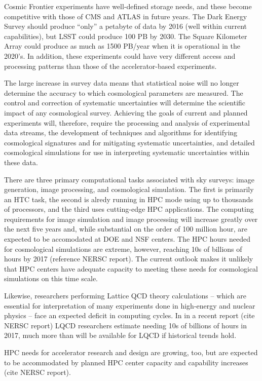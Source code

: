 Cosmic Frontier experiments have well-defined storage needs, and these become competitive with those of CMS and ATLAS in future years.  The Dark Energy Survey should produce ``only'' a petabyte of data by 2016 (well within current capabilities), but LSST could produce 100 PB by 2030.  The Square Kilometer Array could produce as much as 1500 PB/year when it is operational in the 2020's.  In addition, these experiments could have very different access and processing patterns than those of the accelerator-based experiments.  

The large increase in survey data means that statistical noise will no longer determine the accuracy to which cosmological parameters are 
measured. The control and correction of systematic uncertainties will determine the scientific impact of any cosmological survey. 
Achieving the goals of current and planned experiments will, therefore, require the processing and analysis of experimental data streams, 
the development of techniques and algorithms for identifying cosmological signatures and for mitigating systematic uncertainties, 
 and detailed cosmological simulations for use in interpreting systematic uncertainties within these data. 

There are three primary computational tasks associated with sky surveys: image generation, image processing, and cosmological simulation. The first 
is primarily an HTC task, the second is alredy running in HPC mode using up to thousands of processors, and the third uses cutting-edge HPC applications.  The computing requirements for image simulation and image processing will increase greatly over the next five years and, while substantial
on the order of 100 million hour, are expected to be accomodated at DOE and NSF centers. The HPC hours needed for cosmological simulations are extreme, however, reaching 10s of billions of hours by 2017 (reference NERSC report). The current outlook
makes it unlikely that HPC centers have adequate capacity to meeting these needs for cosmological
simulations on this time scale. 
 
Likewise, researchers performing Lattice QCD theory calculations 
-- which are essential for interpretation of many experiments done in high-energy and nuclear physics -- 
face an expected deficit in computing cycles. In in a recent report (cite NERSC report) 
LQCD researchers estimate needing 10s of billions of  hours in 2017, much more than will be available 
for LQCD if historical trends hold.

HPC needs for accelerator research and design are growing, too, but are expected to be accommodated by planned HPC center capacity and capability increases (cite NERSC report). 


